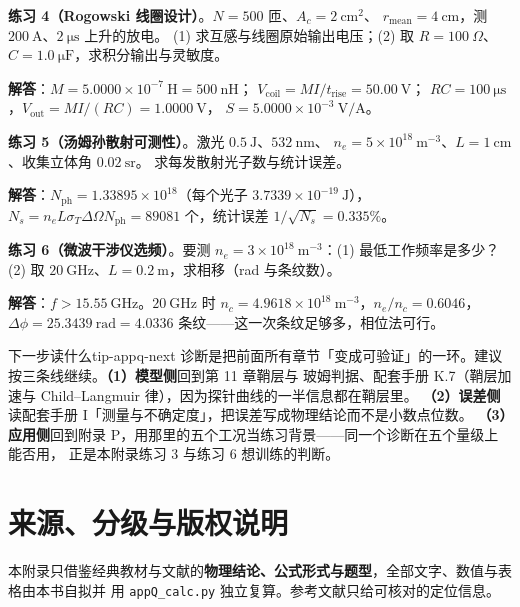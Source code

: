 \textbf{练习 4（Rogowski 线圈设计）}。$N=500$ 匝、$A_c=2\ \mathrm{cm^2}$、
$r_{\mathrm{mean}}=4\ \mathrm{cm}$，测 $200\ \mathrm{A}$、$2\ \mathrm{\mu s}$ 上升的放电。
(1) 求互感与线圈原始输出电压；(2) 取 $R=100\ \Omega$、$C=1.0\ \mathrm{\mu F}$，求积分输出与灵敏度。

\textbf{解答}：$M=5.0000\times10^{-7}\ \mathrm{H}=500\ \mathrm{nH}$；
$V_{\mathrm{coil}}=MI/t_{\mathrm{rise}}=50.00\ \mathrm{V}$；
$RC=100\ \mathrm{\mu s}$，$V_{\mathrm{out}}=MI/(RC)=1.0000\ \mathrm{V}$，
$S=5.0000\times10^{-3}\ \mathrm{V/A}$。

\textbf{练习 5（汤姆孙散射可测性）}。激光 $0.5\ \mathrm{J}$、$532\ \mathrm{nm}$、
$n_e=5\times10^{18}\ \mathrm{m^{-3}}$、$L=1\ \mathrm{cm}$、收集立体角 $0.02\ \mathrm{sr}$。
求每发散射光子数与统计误差。

\textbf{解答}：$N_{\mathrm{ph}}=1.33895\times10^{18}$（每个光子 $3.7339\times10^{-19}\ \mathrm{J}$），
$N_s=n_eL\sigma_T\Delta\Omega N_{\mathrm{ph}}=89081$ 个，统计误差
$1/\sqrt{N_s}=0.335\%$。

\textbf{练习 6（微波干涉仪选频）}。要测 $n_e=3\times10^{18}\ \mathrm{m^{-3}}$：(1) 最低工作频率是多少？
(2) 取 $20\ \mathrm{GHz}$、$L=0.2\ \mathrm{m}$，求相移（rad 与条纹数）。

\textbf{解答}：$f>15.55\ \mathrm{GHz}$。$20\ \mathrm{GHz}$ 时
$n_c=4.9618\times10^{18}\ \mathrm{m^{-3}}$，$n_e/n_c=0.6046$，
$\Delta\phi=25.3439\ \mathrm{rad}=4.0336$ 条纹——这一次条纹足够多，相位法可行。

\begin{tip}{下一步读什么}{tip-appq-next}
诊断是把前面所有章节「变成可验证」的一环。建议按三条线继续。\textbf{（1）模型侧}回到第 11 章鞘层与
玻姆判据、配套手册 K.7（鞘层加速与 Child--Langmuir 律），因为探针曲线的一半信息都在鞘层里。
\textbf{（2）误差侧}读配套手册 I「测量与不确定度」，把误差写成物理结论而不是小数点位数。
\textbf{（3）应用侧}回到附录 P，用那里的五个工况当练习背景——同一个诊断在五个量级上能否用，
正是本附录练习 3 与练习 6 想训练的判断。
\end{tip}

\section{来源、分级与版权说明}
\label{sec:app-q-source}

\begingroup\small
本附录只借鉴经典教材与文献的\textbf{物理结论、公式形式与题型}，全部文字、数值与表格由本书自拟并
用 \texttt{appQ\_calc.py} 独立复算。参考文献只给可核对的定位信息。

